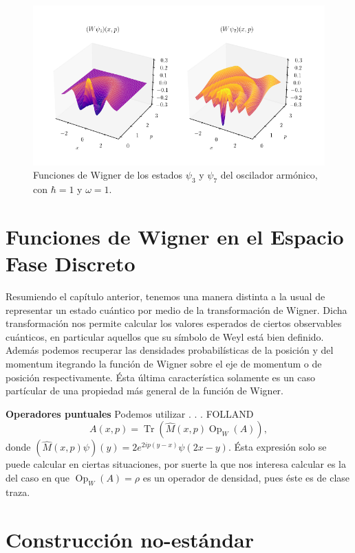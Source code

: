 \documentclass[a4paper]{report}
\DeclareMathOperator{\Tr}{Tr}
\DeclareMathOperator{\Op}{Op}
\begin{document}
  \begin{figure}[ht]
    \centering
    \includegraphics[width=1\textwidth]{imgs/harmonic_osc_wigner.png}
    \caption{Funciones de Wigner de los estados $\psi_3$ y
    $\psi_7$ del oscilador armónico, con $\hbar = 1$ y
    $\omega = 1$.}
    \label{fig:harmonic_osc_wigner_3_7}
  \end{figure}

  \chapter{Funciones de Wigner en el Espacio Fase Discreto}

  Resumiendo el capítulo anterior, tenemos una manera
  distinta a la usual de representar un estado cuántico por
  medio de la transformación de Wigner. Dicha transformación
  nos permite calcular los valores esperados de ciertos
  observables cuánticos, en particular aquellos que su
  símbolo de Weyl está bien definido. Además podemos
  recuperar las densidades probabilísticas de la posición y
  del momentum itegrando la función de Wigner sobre el eje
  de momentum o de posición respectivamente. Ésta última
  característica solamente es un caso partícular de una
  propiedad más general de la función de Wigner.

  \textbf{Operadores puntuales} Podemos utilizar . . .
  FOLLAND
  \begin{equation}
    A(x,p) =
    \Tr\left( \hat{M}(x,p) \Op_W(A) \right),
  \end{equation}
  donde $(\hat{M}(x,p)\psi)(y) = 2e^{2i p (y - x)}\psi(2x -
  y)$. Ésta expresión solo se puede calcular en ciertas
  situaciones, por suerte la que nos interesa calcular es la
  del caso en que $\Op_W(A) = \rho$ es un operador de
  densidad, pues éste es de clase traza.

  \chapter{Construcción no-estándar}
\end{document}
